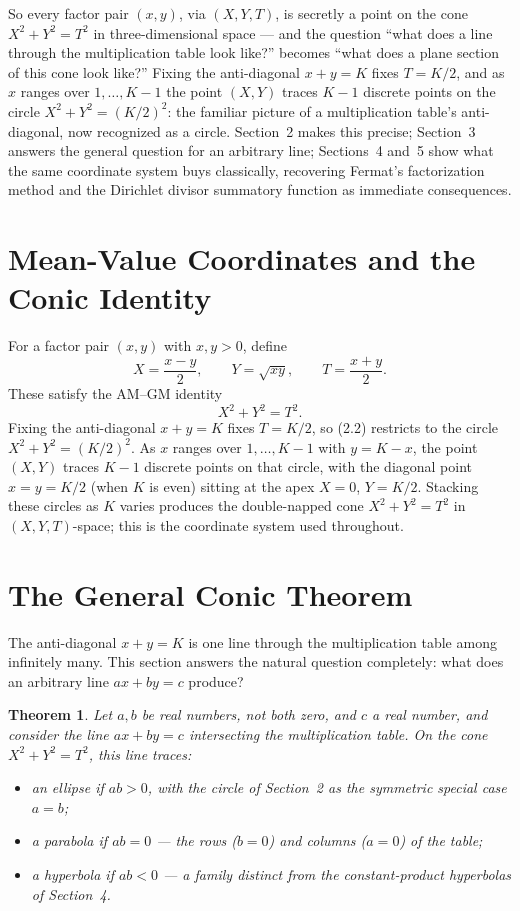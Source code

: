\documentclass[11pt]{amsart}
\newtheorem{theorem}{Theorem}[section]
\theoremstyle{remark}
\begin{document}
So every factor pair $(x,y)$, via $(X,Y,T)$, is secretly a point on the cone $X^2+Y^2=T^2$ in three-dimensional space --- and the question ``what does a line through the multiplication table look like?'' becomes ``what does a plane section of this cone look like?'' Fixing the anti-diagonal $x+y=K$ fixes $T=K/2$, and as $x$ ranges over $1,\dots,K-1$ the point $(X,Y)$ traces $K-1$ discrete points on the circle $X^2+Y^2=(K/2)^2$: the familiar picture of a multiplication table's anti-diagonal, now recognized as a circle. Section~2 makes this precise; Section~3 answers the general question for an arbitrary line; Sections~4 and~5 show what the same coordinate system buys classically, recovering Fermat's factorization method and the Dirichlet divisor summatory function as immediate consequences.

\section{Mean-Value Coordinates and the Conic Identity}

For a factor pair $(x,y)$ with $x,y>0$, define
\begin{equation}
X=\frac{x-y}2,\qquad Y=\sqrt{xy},\qquad T=\frac{x+y}2. \tag{2.1}
\end{equation}
These satisfy the AM--GM identity
\begin{equation}
X^2+Y^2=T^2. \tag{2.2}
\end{equation}
Fixing the anti-diagonal $x+y=K$ fixes $T=K/2$, so (2.2) restricts to the circle $X^2+Y^2=(K/2)^2$. As $x$ ranges over $1,\dots,K-1$ with $y=K-x$, the point $(X,Y)$ traces $K-1$ discrete points on that circle, with the diagonal point $x=y=K/2$ (when $K$ is even) sitting at the apex $X=0$, $Y=K/2$. Stacking these circles as $K$ varies produces the double-napped cone $X^2+Y^2=T^2$ in $(X,Y,T)$-space; this is the coordinate system used throughout.

\section{The General Conic Theorem}

The anti-diagonal $x+y=K$ is one line through the multiplication table among infinitely many. This section answers the natural question completely: what does an arbitrary line $ax+by=c$ produce?

\begin{theorem}\label{thm:conic}
Let $a,b$ be real numbers, not both zero, and $c$ a real number, and consider the line $ax+by=c$ intersecting the multiplication table. On the cone $X^2+Y^2=T^2$, this line traces:
\begin{itemize}
\item an ellipse if $ab>0$, with the circle of Section~2 as the symmetric special case $a=b$;
\item a parabola if $ab=0$ --- the rows ($b=0$) and columns ($a=0$) of the table;
\item a hyperbola if $ab<0$ --- a family distinct from the constant-product hyperbolas of Section~4.
\end{itemize}
\end{theorem}
\end{document}
